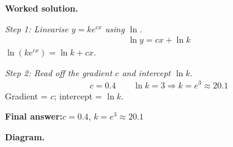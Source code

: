 \documentclass[11pt]{article}
\begin{document}
\textbf{Worked solution.}

\textit{Step 1: Linearise \( y = ke^{cx} \) using \( \ln \).}
\[\begin{gathered}
\ln y = cx + \ln k
\end{gathered}\]
\( \ln(ke^{cx}) = \ln k + cx \).

\textit{Step 2: Read off the gradient \( c \) and intercept \( \ln k \).}
\[\begin{gathered}
c = 0.4 \qquad \ln k = 3 \Rightarrow k = e^3 \approx 20.1
\end{gathered}\]
Gradient = \( c \); intercept = \( \ln k \).

\begin{answerbox}
\textbf{Final answer:}\quad \(\displaystyle  c = 0.4 \), \(\displaystyle  k = e^3 \approx 20.1 \)
\end{answerbox}
\textbf{Diagram.}
\end{document}
